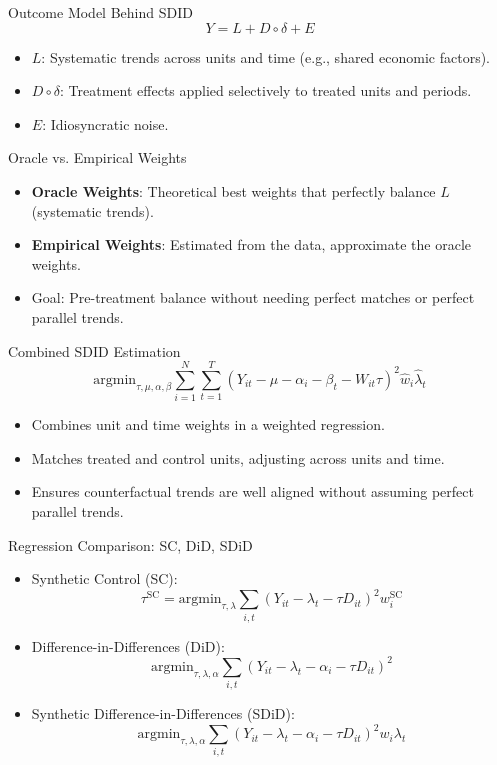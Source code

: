 \documentclass{beamer}
\begin{document}
\begin{frame}{Outcome Model Behind SDID}
\small
\[
Y = L + D \circ \delta + E
\]
\begin{itemize}
  \item \(L\): Systematic trends across units and time (e.g., shared economic factors).
  \item \(D \circ \delta\): Treatment effects applied selectively to treated units and periods.
  \item \(E\): Idiosyncratic noise.
\end{itemize}
\end{frame}


\begin{frame}{Oracle vs. Empirical Weights}
\small
\begin{itemize}
  \item \textbf{Oracle Weights}: Theoretical best weights that perfectly balance \(L\) (systematic trends).
  \item \textbf{Empirical Weights}: Estimated from the data, approximate the oracle weights.
  \item Goal: Pre-treatment balance without needing perfect matches or perfect parallel trends.
\end{itemize}
\end{frame}





\begin{frame}{Combined SDID Estimation}
\small
\[
\text{argmin}_{\tau, \mu, \alpha, \beta} \sum_{i=1}^N \sum_{t=1}^T (Y_{it} - \mu - \alpha_i - \beta_t - W_{it} \tau)^2 \hat{w}_i \hat{\lambda}_t
\]
\begin{itemize}
  \item Combines unit and time weights in a weighted regression.
  \item Matches treated and control units, adjusting across units and time.
  \item Ensures counterfactual trends are well aligned without assuming perfect parallel trends.
\end{itemize}
\end{frame}



\begin{frame}{Regression Comparison: SC, DiD, SDiD}

\begin{itemize}
    \item Synthetic Control (SC):
    \[
    \tau^{\text{SC}} = \textrm{argmin}_{\tau, \lambda} \sum_{i,t} (Y_{it} - \lambda_t - \tau D_{it})^2 w_i^{\text{SC}}
    \]
    \item Difference-in-Differences (DiD):
    \[
    \text{argmin}_{\tau, \lambda, \alpha} \sum_{i,t} (Y_{it} - \lambda_t - \alpha_i - \tau D_{it})^2
    \]
    \item Synthetic Difference-in-Differences (SDiD):
    \[
    \text{argmin}_{\tau, \lambda, \alpha} \sum_{i,t} (Y_{it} - \lambda_t - \alpha_i - \tau D_{it})^2 w_i \lambda_t
    \]
\end{itemize}

\end{frame}
\end{document}

